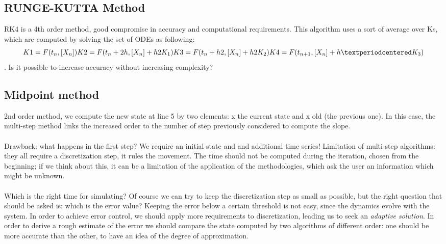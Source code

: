   \subsection{RUNGE-KUTTA Method}
  RK4 is a 4th order method, good compromise in accuracy and computational requirements.
  This algorithm uses a sort of average over Ks, which are computed by solving the set of ODEs as following:
  $$K1 = F(t_n,[X_n])\\ K2 = F(t_n + 2h,[X_n]+ h2K_1)\\K3 = F(t_n + h2,[X_n]+ h2K_2)\\ K4 = F(t_{n+1},[X_n]+h·K_3)$$.
  Is it possible to increase accuracy without increasing complexity?

  \subsection{Midpoint method}
  2nd order method, we compute the new state at line 5 by two elements: x the current state and x old (the previous one).
  In this case, the multi-step method links the increased order to the number of step previously considered to compute the slope.
  \\
  \\
  \noindent
  Drawback: what happens in the first step? We require an initial state and and additional time series! Limitation of multi-step algorithms: they all require a discretization step, it rules the movement.
  The time should not be computed during the iteration, chosen from the beginning; if we think about this, it can be a limitation of the application of the methodologies, which ask the user an information which might be unknown.
  \\
  \\
  \noindent
  Which is the right time for simulating? Of course we can try to keep the discretization step as small as possible, but the right question that should be asked is: which is the error value? Keeping the error below a certain threshold is not easy, since the dynamics evolve with the system.
  In order to achieve error control, we should apply more requirements to discretization, leading us to seek an \emph{adaptive solution}.
  In order to derive a rough estimate of the error we should compare the state computed by two algorithms of different order: one should be more accurate than the other, to have an idea of the degree of approximation.

